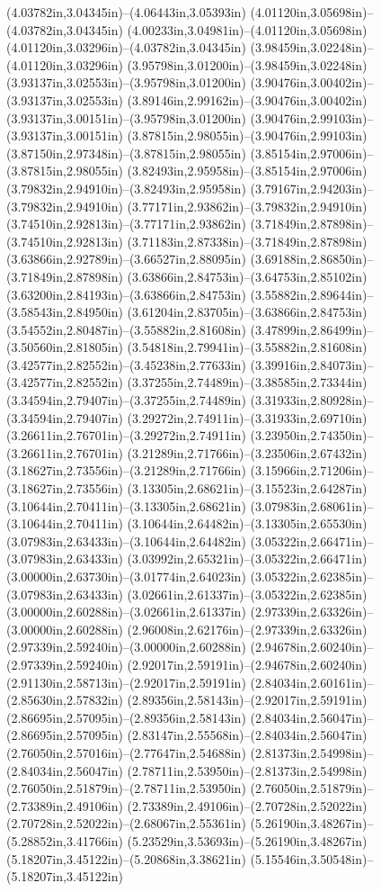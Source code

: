 (4.03782in,3.04345in)--(4.06443in,3.05393in) (4.01120in,3.05698in)--(4.03782in,3.04345in) (4.00233in,3.04981in)--(4.01120in,3.05698in) (4.01120in,3.03296in)--(4.03782in,3.04345in) (3.98459in,3.02248in)--(4.01120in,3.03296in) (3.95798in,3.01200in)--(3.98459in,3.02248in) (3.93137in,3.02553in)--(3.95798in,3.01200in) (3.90476in,3.00402in)--(3.93137in,3.02553in) (3.89146in,2.99162in)--(3.90476in,3.00402in) (3.93137in,3.00151in)--(3.95798in,3.01200in) (3.90476in,2.99103in)--(3.93137in,3.00151in) (3.87815in,2.98055in)--(3.90476in,2.99103in) (3.87150in,2.97348in)--(3.87815in,2.98055in) (3.85154in,2.97006in)--(3.87815in,2.98055in) (3.82493in,2.95958in)--(3.85154in,2.97006in) (3.79832in,2.94910in)--(3.82493in,2.95958in) (3.79167in,2.94203in)--(3.79832in,2.94910in) (3.77171in,2.93862in)--(3.79832in,2.94910in) (3.74510in,2.92813in)--(3.77171in,2.93862in) (3.71849in,2.87898in)--(3.74510in,2.92813in) (3.71183in,2.87338in)--(3.71849in,2.87898in) (3.63866in,2.92789in)--(3.66527in,2.88095in) (3.69188in,2.86850in)--(3.71849in,2.87898in) (3.63866in,2.84753in)--(3.64753in,2.85102in) (3.63200in,2.84193in)--(3.63866in,2.84753in) (3.55882in,2.89644in)--(3.58543in,2.84950in) (3.61204in,2.83705in)--(3.63866in,2.84753in) (3.54552in,2.80487in)--(3.55882in,2.81608in) (3.47899in,2.86499in)--(3.50560in,2.81805in) (3.54818in,2.79941in)--(3.55882in,2.81608in) (3.42577in,2.82552in)--(3.45238in,2.77633in) (3.39916in,2.84073in)--(3.42577in,2.82552in) (3.37255in,2.74489in)--(3.38585in,2.73344in) (3.34594in,2.79407in)--(3.37255in,2.74489in) (3.31933in,2.80928in)--(3.34594in,2.79407in) (3.29272in,2.74911in)--(3.31933in,2.69710in) (3.26611in,2.76701in)--(3.29272in,2.74911in) (3.23950in,2.74350in)--(3.26611in,2.76701in) (3.21289in,2.71766in)--(3.23506in,2.67432in) (3.18627in,2.73556in)--(3.21289in,2.71766in) (3.15966in,2.71206in)--(3.18627in,2.73556in) (3.13305in,2.68621in)--(3.15523in,2.64287in) (3.10644in,2.70411in)--(3.13305in,2.68621in) (3.07983in,2.68061in)--(3.10644in,2.70411in) (3.10644in,2.64482in)--(3.13305in,2.65530in) (3.07983in,2.63433in)--(3.10644in,2.64482in) (3.05322in,2.66471in)--(3.07983in,2.63433in) (3.03992in,2.65321in)--(3.05322in,2.66471in) (3.00000in,2.63730in)--(3.01774in,2.64023in) (3.05322in,2.62385in)--(3.07983in,2.63433in) (3.02661in,2.61337in)--(3.05322in,2.62385in) (3.00000in,2.60288in)--(3.02661in,2.61337in) (2.97339in,2.63326in)--(3.00000in,2.60288in) (2.96008in,2.62176in)--(2.97339in,2.63326in) (2.97339in,2.59240in)--(3.00000in,2.60288in) (2.94678in,2.60240in)--(2.97339in,2.59240in) (2.92017in,2.59191in)--(2.94678in,2.60240in) (2.91130in,2.58713in)--(2.92017in,2.59191in) (2.84034in,2.60161in)--(2.85630in,2.57832in) (2.89356in,2.58143in)--(2.92017in,2.59191in) (2.86695in,2.57095in)--(2.89356in,2.58143in) (2.84034in,2.56047in)--(2.86695in,2.57095in) (2.83147in,2.55568in)--(2.84034in,2.56047in) (2.76050in,2.57016in)--(2.77647in,2.54688in) (2.81373in,2.54998in)--(2.84034in,2.56047in) (2.78711in,2.53950in)--(2.81373in,2.54998in) (2.76050in,2.51879in)--(2.78711in,2.53950in) (2.76050in,2.51879in)--(2.73389in,2.49106in) (2.73389in,2.49106in)--(2.70728in,2.52022in) (2.70728in,2.52022in)--(2.68067in,2.55361in) (5.26190in,3.48267in)--(5.28852in,3.41766in) (5.23529in,3.53693in)--(5.26190in,3.48267in) (5.18207in,3.45122in)--(5.20868in,3.38621in) (5.15546in,3.50548in)--(5.18207in,3.45122in) 